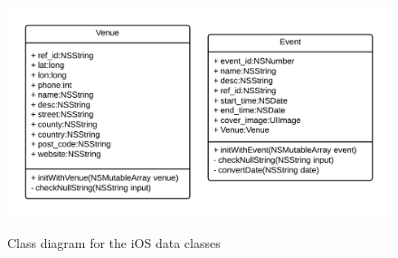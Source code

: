 			\begin{figure}
				\centering
				\caption{Class diagram for the iOS data classes}
				\includegraphics[width=0.6\linewidth]{Images/ios-data}
				\label{fig:ios-data}
			\end{figure}